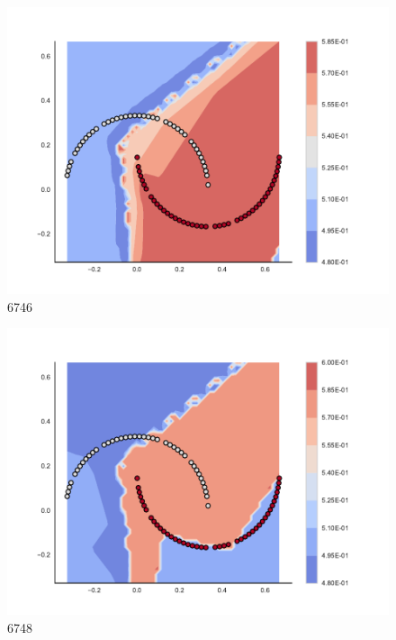 \begin{subfigure}[b]{0.09\textwidth}
    \includegraphics[clip, trim=2.35cm 1.75cm 4.5cm 0cm,width=\textwidth]{img/convergence/6746.pdf}
    \caption{6746}
    \label{fig:convergence_6746}
\end{subfigure}
%
\begin{subfigure}[b]{0.09\textwidth}
    \includegraphics[clip, trim=2.35cm 1.75cm 4.5cm 0cm,width=\textwidth]{img/convergence/6748.pdf}
    \caption{6748}
    \label{fig:convergence_6748}
\end{subfigure}
%
